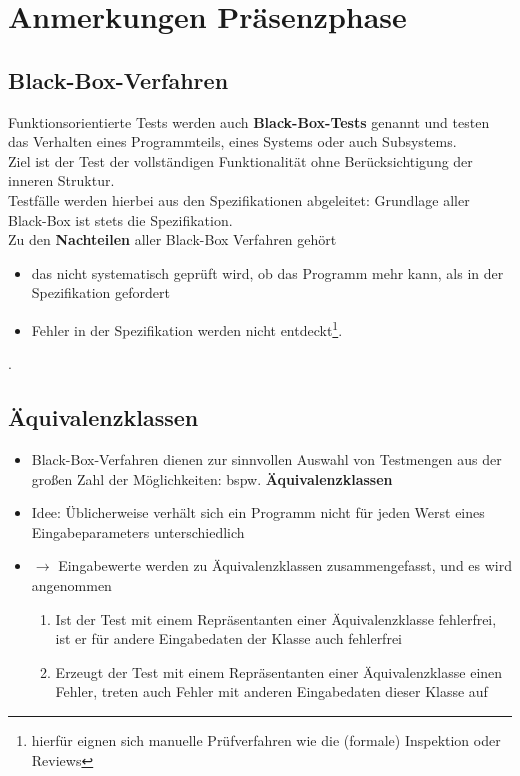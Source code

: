 \chapter{Anmerkungen Präsenzphase}

\section{Black-Box-Verfahren}

Funktionsorientierte Tests werden auch \textbf{Black-Box-Tests} genannt und testen das Verhalten eines Programmteils, eines Systems oder auch Subsystems.\\
Ziel ist der Test der vollständigen Funktionalität ohne Berücksichtigung der inneren Struktur.\\
Testfälle werden hierbei aus den Spezifikationen abgeleitet: Grundlage aller Black-Box ist stets die Spezifikation.\\

\noindent
Zu den \textbf{Nachteilen} aller Black-Box Verfahren gehört
\begin{itemize}
    \item das nicht systematisch geprüft wird, ob das Programm mehr kann, als in der Spezifikation gefordert
    \item Fehler in der Spezifikation werden nicht entdeckt\footnote{
    hierfür eignen sich manuelle Prüfverfahren wie die (formale) Inspektion oder Reviews
    }.
\end{itemize}.

\section{Äquivalenzklassen}

\begin{itemize}
    \item Black-Box-Verfahren dienen zur sinnvollen Auswahl von Testmengen aus der großen Zahl der Möglichkeiten: bspw. \textbf{Äquivalenzklassen}
    \item Idee: Üblicherweise verhält sich ein Programm nicht für jeden Werst eines Eingabeparameters unterschiedlich
    \item[] $\rightarrow$ Eingabewerte werden zu Äquivalenzklassen zusammengefasst, und es wird angenommen
    \begin{enumerate}
        \item Ist der Test mit einem Repräsentanten einer Äquivalenzklasse fehlerfrei, ist er für andere Eingabedaten der Klasse auch fehlerfrei
        \item Erzeugt der Test mit einem Repräsentanten einer Äquivalenzklasse einen Fehler, treten auch Fehler mit anderen Eingabedaten dieser Klasse auf
    \end{enumerate}
\end{itemize}

